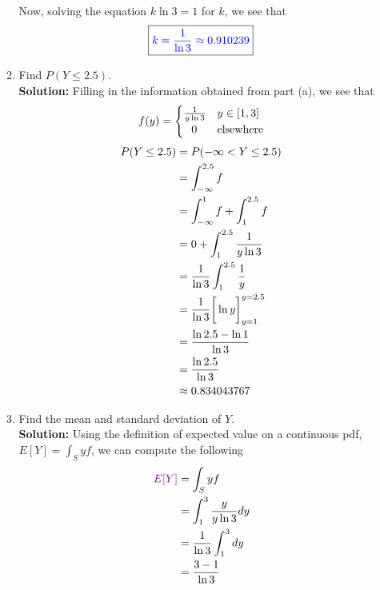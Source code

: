 \documentclass[12pt]{article}
\renewcommand{\over}[1]{\frac{1}{{#1}}}
\begin{document}
\begin{enumerate}
\begin{enumerate}
\begin{align}
        \end{align}
        Now, solving the equation $k\ln3 = 1$ for $k$, we see that
        $$\boxed{\color{blue}k = \frac{1}{\ln3} \approx 0.910239}$$
        \vspace{0.15in}
        \item Find $P(Y \leq 2.5)$.
        \vspace{0.15in}\\
        \textbf{Solution:} Filling in the information obtained from part (a), we see that
        $$f(y) = \begin{cases} 
          \frac{1}{y\ln3} & y \in [1,3] \\
          \hspace{0.25cm} 0 & \text{elsewhere} 
       \end{cases}$$
        \begin{align}
            P(Y \leq 2.5) &= P( -\infty < Y \leq 2.5) \notag\\
            &= \int_{-\infty}^{2.5} f \notag\\
            &= \int_{-\infty}^{1}f + \int_{1}^{2.5}f \notag\\
            &= 0 + \int_{1}^{2.5} \frac{1}{y\ln3} \notag\\
            &= \frac{1}{\ln3} \int_1^{2.5} \over{y} \notag\\
            &= \frac{1}{\ln3} \bigg[ \ln y \bigg]_{y=1}^{y=2.5}\notag\\
            &= \frac{\ln 2.5 - \ln 1}{\ln3}\notag\\
            &= \frac{\ln 2.5}{\ln 3} \notag\\
            &\approx 0.834043767 \notag
        \end{align}
        \vspace{0.15in}
        \item Find the mean and standard deviation of $Y$.
        \vspace{0.15in}\\
        \textbf{Solution:} Using the definition of expected value on a continuous pdf, $E[Y] = \int_S y f$, we can compute the following
        \begin{align}
            \color{violet}E[Y]\color{black} &= \int_S yf \notag\\
            &= \int_1^3 \frac{y}{y\ln3}dy \notag\\
            &= \over{\ln3} \int_1^3 dy \notag\\
            &= \frac{3-1}{\ln3} \notag\\

\end{align}
\end{enumerate}
\end{enumerate}
\end{document}
